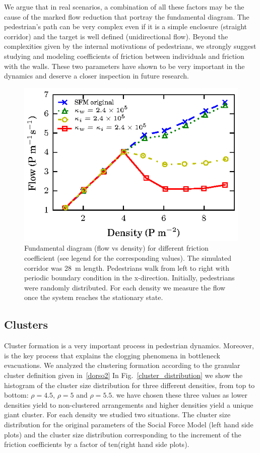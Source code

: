We argue that in real scenarios, a combination of all these factors may be the cause of the marked flow reduction that portray the fundamental diagram. The pedestrian's path can be very complex even if it is a simple enclosure (straight corridor) and the target is well defined (unidirectional flow). Beyond the complexities given by the internal motivations of pedestrians, we strongly suggest studying and modeling coefficients of friction between individuals and friction with the walls. These two parameters have shown to be very important in the dynamics and deserve a closer inspection in future research. 


\begin{figure}[htbp!]
\includegraphics[width=\columnwidth]
{plots/flow-density_pasillo22m_fgmodified_multi.eps}
\caption{\label{fgmodified-w22} Fundamental diagram (flow vs density) for different friction coefficient (see legend for the corresponding values). The simulated corridor was 28~m length. Pedestrians walk from left to right with periodic boundary condition in the x-direction. Initially, pedestrians were randomly distributed. For each density we measure the flow once the system reaches the stationary state.}
\end{figure}


\subsection{\label{clusters}Clusters}

Cluster formation is a very important process in pedestrian dynamics. Moreover, is the key process that explains the clogging phenomena in bottleneck evacuations. We analyzed the clustering formation according to the granular cluster definition given in~\ref{dorso2}
In Fig.~\ref{cluster_distribution} we show the histogram of the cluster size distribution for three different densities, from top to bottom: $\rho=4.5$, $\rho=5$ and $\rho=5.5$. we have chosen these three values as lower densities yield to non-clustered arrangements and higher densities yield a unique giant cluster.     
For each density we studied two situations. The cluster size distribution for the original parameters of the Social Force Model (left hand side plots) and the cluster size distribution corresponding to the increment of the friction coefficients by a factor of ten(right hand side plots).

